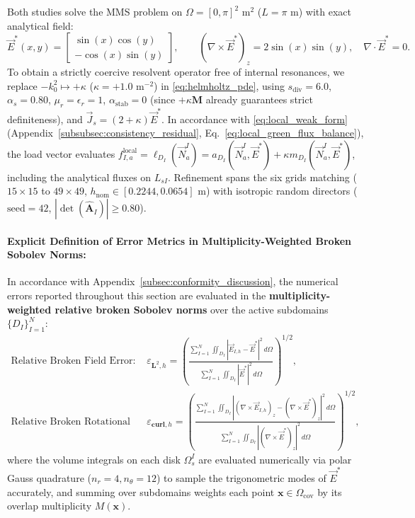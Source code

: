 \documentclass[VANCOUVER]{USG}
\begin{document}
Both studies solve the MMS problem on $\Omega = [0, \pi]^2\text{ m}^2$ ($L = \pi\text{ m}$) with exact analytical field:
\begin{equation}
    \vec{E}^*(x, y) = \begin{bmatrix} \sin(x) \cos(y) \\ -\cos(x) \sin(y) \end{bmatrix}, \qquad (\nabla \times \vec{E}^*)_z = 2\sin(x)\sin(y), \quad \nabla \cdot \vec{E}^* = 0.
\end{equation}
To obtain a strictly coercive resolvent operator free of internal resonances, we replace $-k_0^2 \mapsto +\kappa$ ($\kappa = +1.0\text{ m}^{-2}$) in \eqref{eq:helmholtz_pde}, using $s_{\mathrm{div}} = 6.0$, $\alpha_s = 0.80$, $\mu_r = \epsilon_r = 1$, $\alpha_{\mathrm{stab}} = 0$ (since $+\kappa\mathbf{M}$ already guarantees strict definiteness), and $\vec{J}_s = (2 + \kappa) \vec{E}^*$. In accordance with \eqref{eq:local_weak_form} (Appendix~\ref{subsubsec:consistency_residual}, Eq.~\eqref{eq:local_green_flux_balance}), the load vector evaluates $f_{I, a}^{\mathrm{local}} = \ell_{D_I}(\vec{N}_a^I) = a_{D_I}(\vec{N}_a^I, \vec{E}^*) + \kappa m_{D_I}(\vec{N}_a^I, \vec{E}^*)$, including the analytical fluxes on $L_{sI}$. Refinement spans the six grids matching \cite{stable_vnmm2d_2026} ($15\times 15$ to $49\times 49$, $h_{\mathrm{nom}} \in [0.2244, 0.0654]\text{ m}$) with isotropic random directors ($\text{seed}=42$, $|\det(\widehat{\mathbf{A}}_I)| \ge 0.80$).

\paragraph*{Explicit Definition of Error Metrics in Multiplicity-Weighted Broken Sobolev Norms:\hspace*{0.35em}}
In accordance with Appendix~\ref{subsec:conformity_discussion}, the numerical errors reported throughout this section are evaluated in the \textbf{multiplicity-weighted relative broken Sobolev norms} over the active subdomains $\{D_I\}_{I=1}^N$:
\begin{align}
    \text{Relative Broken Field Error: } \quad & \varepsilon_{\boldsymbol{L}^2, h} = \left( \frac{\sum_{I=1}^N \iint_{D_I} |\vec{E}_{I,h} - \vec{E}^*|^2 \, d\Omega}{\sum_{I=1}^N \iint_{D_I} |\vec{E}^*|^2 \, d\Omega} \right)^{1/2}, \label{eq:mms_broken_L2} \\
    \text{Relative Broken Rotational Error: } \quad & \varepsilon_{\mathbf{curl}, h} = \left( \frac{\sum_{I=1}^N \iint_{D_I} |(\nabla \times \vec{E}_{I,h})_z - (\nabla \times \vec{E}^*)_z|^2 \, d\Omega}{\sum_{I=1}^N \iint_{D_I} |(\nabla \times \vec{E}^*)_z|^2 \, d\Omega} \right)^{1/2}, \label{eq:mms_broken_curl}
\end{align}
where the volume integrals on each disk $\Omega_s^I$ are evaluated numerically via polar Gauss quadrature ($n_r=4, n_\theta=12$) to sample the trigonometric modes of $\vec{E}^*$ accurately, and summing over subdomains weights each point $\mathbf{x} \in \Omega_{\mathrm{cov}}$ by its overlap multiplicity $M(\mathbf{x})$.
\end{document}
